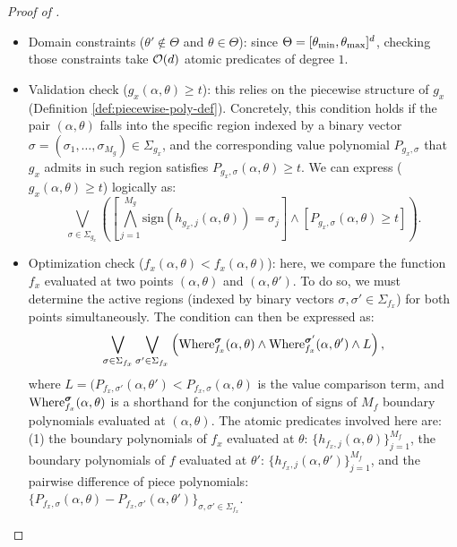 \begin{proof}[Proof of ]
\begin{itemize}[leftmargin=*]
        \begin{itemize}[leftmargin=*]
            \item Domain constraints ($\theta' \not \in \Theta$ and $\theta \in \Theta$): since $\Theta = [\theta_\textup{min}, \theta_\textup{max}]^d$, checking those constraints take $\mathcal{O}(d)$ atomic predicates of degree $1$.
            \item Validation check ($g_x(\alpha, \theta) \geq t$): this relies on the piecewise structure of $g_x$ (Definition \ref{def:piecewise-poly-def}). Concretely, this condition holds if the pair $(\alpha, \theta)$ falls into the specific region indexed by a binary vector  $\sigma = (\sigma_1, \dots, \sigma_{M_g}) \in \Sigma_{g_x}$, and the corresponding value polynomial $P_{g_x, \sigma}$ that $g_x$ admits in such region satisfies $P_{g_x,\sigma}(\alpha, \theta) \geq t$. We can express ($g_x(\alpha, \theta) \geq t$) logically as:
            \[
                  \bigvee_{\sigma \in \Sigma_{g_x}} \left( \left[ \bigwedge_{j=1}^{M_g} \text{sign}(h_{g_x,j}(\alpha, \theta)) = \sigma_j \right] \land [P_{g_x, \sigma}(\alpha, \theta) \geq t] \right).
            \]
            \item Optimization check ($f_x(\alpha, \theta) < f_x(\alpha, \theta)$): here, we compare the function $f_x$ evaluated at two points $(\alpha, \theta)$ and $(\alpha, \theta')$. To do so, we must determine the active regions (indexed by binary vectors $\sigma, \sigma' \in \Sigma_{f_x}$) for both points simultaneously. The condition can then be expressed as:
            \[
                \bigvee_{\sigma \in\Sigma_{f_x}}\bigvee_{\sigma' \in\Sigma_{f_x}}\left( \textup{Where}^{\boldsymbol{\sigma}}_{f_{x}}(\alpha, \theta) \land \textup{Where}^{\boldsymbol{\sigma}'}_{f_{x}}(\alpha, \theta') \land L\right),
            \]
            where $L = (P_{f_x, \sigma'}(\alpha, \theta') < P_{f_x, \sigma}(\alpha, \theta)$ is the value comparison term, and $\textup{Where}^{\boldsymbol{\sigma}}_{f_{x}}(\alpha, \theta)$ is a shorthand for the conjunction of signs of $M_f$ boundary polynomials evaluated at $(\alpha, \theta)$. The atomic predicates involved here are: (1) the boundary polynomials of $f_x$ evaluated at $\theta$: $\{h_{f_x, j}(\alpha, \theta)\}_{j = 1}^{M_f}$, the boundary polynomials of $f$ evaluated at $\theta'$: $\{h_{f_x, j}(\alpha, \theta')\}_{j = 1}^{M_f}$, and the pairwise difference of piece polynomials: $\{P_{f_x, \sigma}(\alpha, \theta) - P_{f_x, \sigma'}(\alpha, \theta')\}_{\sigma, \sigma'\in \Sigma_{f_x}}$.
        \end{itemize}

\end{itemize}
\end{proof}
